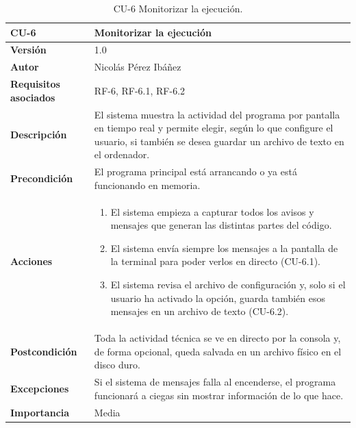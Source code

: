 \begin{table}[p]
	\centering
	\begin{tabularx}{\linewidth}{ p{} p{} }
		\toprule
		\textbf{CU-6}    & \textbf{Monitorizar la ejecución}\\
		\toprule
		\textbf{Versión}              & 1.0    \\
		\textbf{Autor}                & Nicolás Pérez Ibáñez \\
		\textbf{Requisitos asociados} & RF-6, RF-6.1, RF-6.2 \\
		\textbf{Descripción}          & El sistema muestra la actividad del programa por pantalla en tiempo real y permite elegir, según lo que configure el usuario, si también se desea guardar un archivo de texto en el ordenador. \\
		\textbf{Precondición}         & El programa principal está arrancando o ya está funcionando en memoria. \\
		\textbf{Acciones}             &
		\begin{enumerate}
			\def\labelenumi{\arabic{enumi}.}
			\tightlist
			\item El sistema empieza a capturar todos los avisos y mensajes que generan las distintas partes del código.
			\item El sistema envía siempre los mensajes a la pantalla de la terminal para poder verlos en directo (CU-6.1).
			\item El sistema revisa el archivo de configuración y, solo si el usuario ha activado la opción, guarda también esos mensajes en un archivo de texto (CU-6.2).
		\end{enumerate}\\
		\textbf{Postcondición}        & Toda la actividad técnica se ve en directo por la consola y, de forma opcional, queda salvada en un archivo físico en el disco duro. \\
		\textbf{Excepciones}          & Si el sistema de mensajes falla al encenderse, el programa funcionará a ciegas sin mostrar información de lo que hace. \\
		\textbf{Importancia}          & Media \\
		\bottomrule
	\end{tabularx}
	\caption{CU-6 Monitorizar la ejecución.}
\end{table}

